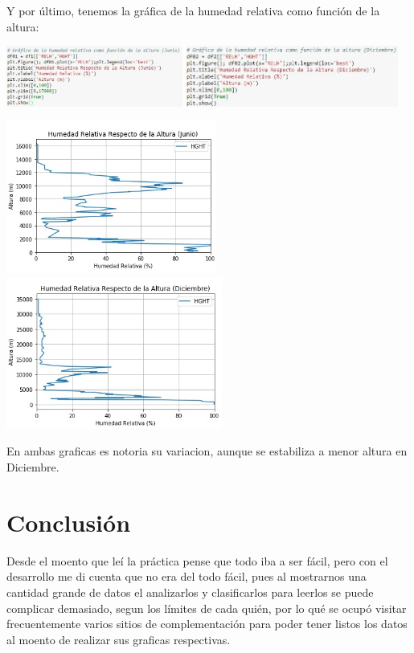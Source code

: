 \documentclass[12pt]{article}
\begin{document}
Y por último, tenemos la gráfica de la humedad relativa como función de la altura:
\begin{center}
	\includegraphics[height=2cm]{dj5.jpg} \hspace*{\fill}
    \includegraphics[height=2cm]{dd5.jpg}
\end{center}
\begin{center}
	\includegraphics[height=5cm]{gj5.jpg}  \hspace*{\fill}
    \includegraphics[height=5cm]{gd5.jpg}
\end{center}
En ambas graficas es notoria su variacion, aunque se estabiliza a menor altura en Diciembre.
\section*{Conclusión}
Desde el moento que leí la práctica pense que todo iba a ser fácil, pero con el desarrollo me di cuenta que no era del todo fácil, pues al mostrarnos una cantidad grande de datos el analizarlos y clasificarlos para leerlos se puede complicar demasiado, segun los límites de cada quién, por lo qué se ocupó visitar frecuentemente varios sitios de complementación para poder tener listos los datos al moento de realizar sus graficas respectivas.\\
\end{document}
